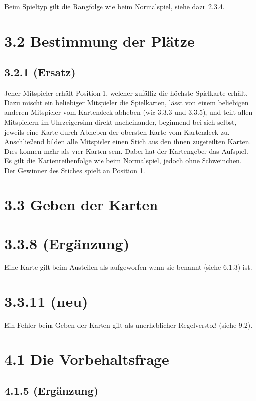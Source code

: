 Beim Spieltyp  gilt die Rangfolge wie beim Normalspiel,
siehe dazu 2.3.4.

\section*{3.2 Bestimmung der Plätze}

\subsection*{3.2.1 (Ersatz)}

Jener Mitspieler erhält Position 1, welcher zufällig die höchste
Spielkarte erhält. Dazu mischt ein beliebiger Mitspieler die
Spielkarten, lässt von einem beliebigen anderen Mitspieler vom
Kartendeck abheben (wie 3.3.3 und 3.3.5), und teilt allen Mitspielern im
Uhrzeigersinn direkt nacheinander, beginnend bei sich selbst, jeweils
eine Karte durch Abheben der obersten Karte vom Kartendeck zu.
Anschließend bilden alle Mitspieler einen Stich aus den ihnen
zugeteilten Karten. Dies können mehr als vier Karten sein. Dabei hat
der Kartengeber das Aufspiel. Es gilt die Kartenreihenfolge wie beim
Normalspiel, jedoch ohne Schweinchen. Der Gewinner des Stiches spielt an
Position 1.

\section*{3.3 Geben der Karten}

\section*{3.3.8 (Ergänzung)}

Eine Karte gilt beim Austeilen als aufgeworfen wenn sie benannt (siehe 6.1.3) ist.

\section*{3.3.11 (neu)}

Ein Fehler beim Geben der Karten gilt als unerheblicher Regelverstoß (siehe
9.2).

\section*{4.1 Die Vorbehaltsfrage}

\subsection*{4.1.5 (Ergänzung)}

